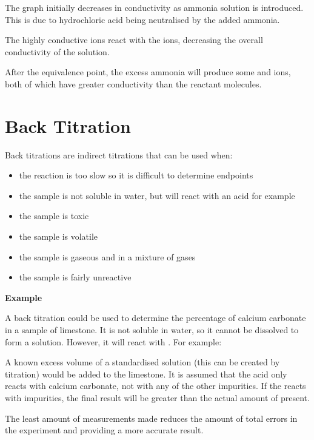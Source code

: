 	The graph initially decreases in conductivity as ammonia solution is introduced. This is due to hydrochloric acid being neutralised by the added ammonia.

	The highly conductive  ions react with the  ions, decreasing the overall conductivity of the solution.

	After the equivalence point, the excess ammonia will produce some  and  ions, both of which have greater conductivity than the reactant molecules.

\section{Back Titration} \label{21/03/2025}

	Back titrations are indirect titrations that can be used when:

	\begin{itemize}
		\item the reaction is too slow so it is difficult to determine endpoints
		\item the sample is not soluble in water, but will react with an acid for example
		\item the sample is toxic
		\item the sample is volatile
		\item the sample is gaseous and in a mixture of gases
		\item the sample is fairly unreactive
	\end{itemize}

	\textbf{Example}
	
	A back titration could be used to determine the percentage of calcium carbonate in a sample of limestone. It is not soluble in water, so it cannot be dissolved to form a solution. However, it will react with . For example:

	\begin{center}
	\end{center}

	A known excess volume of a standardised  solution (this can be created by titration) would be added to the limestone. It is assumed that the acid only reacts with calcium carbonate, not with any of the other impurities. If the  reacts with impurities, the final result will be greater than the actual amount of  present.

	The least amount of measurements made reduces the amount of total errors in the experiment and providing a more accurate result.

